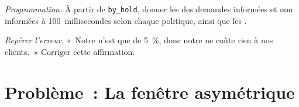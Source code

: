 \begin{exercise}[$\star\star\star$]\label{exo:m2:fx-spot-microstructure:7}
\emph{Programmation.} À partir de \texttt{by\_hold}, donner les  des demandes informées et non informées
à 100~millisecondes selon chaque politique, ainsi que les .
\end{exercise}

\begin{exercise}[$\star\star\star$]\label{exo:m2:fx-spot-microstructure:8}
\emph{Repérer l'erreur.} «~Notre  n'est que de 5~\%, donc notre  ne coûte
rien à nos clients.~» Corriger cette affirmation.
\end{exercise}

\section{Problème~: La fenêtre asymétrique}

